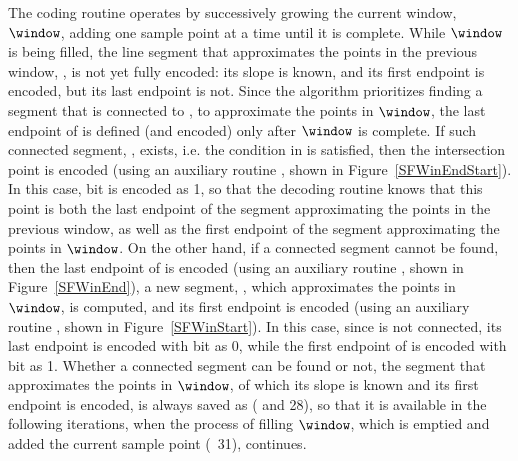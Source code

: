 \vspace{-2pt}



\vspace{-3pt}
The coding routine operates by successively growing the current window, $\window$, adding one sample point at a time until it is complete. While $\window$ is being filled, the line segment that approximates the points in the previous window, \segmentLastT, is not yet fully encoded: its slope is known, and its first endpoint is encoded, but its last endpoint is not. Since the algorithm prioritizes finding a segment that is connected to \segmentLastT, to approximate the points in $\window$, the last endpoint of \segmentLastT is defined (and encoded) only after $\window$ is complete. If such connected segment, \segmentConnT, exists, i.e. the condition in  is satisfied, then the intersection point is encoded (using an auxiliary routine \SFEncodeWinEndStart, shown in Figure~\ref{SFWinEndStart}). In this case, bit \connectedS is encoded as 1, so that the decoding routine knows that this point is both the last endpoint of the segment approximating the points in the previous window, as well as the first endpoint of the segment approximating the points in $\window$. On the other hand, if a connected segment cannot be found, then the last endpoint of \segmentLastT is encoded (using an auxiliary routine \SFWinEndP, shown in Figure~\ref{SFWinEnd}), a new segment, \segmentS, which approximates the points in $\window$, is computed, and its first endpoint is encoded (using an auxiliary routine \SFWinStart, shown in Figure~\ref{SFWinStart}). In this case, since \segmentLastT is not connected, its last endpoint is encoded with bit \connectedS as 0, while the first endpoint of \segmentS is encoded with bit \connectedS as 1. Whether a connected segment can be found or not, the segment that approximates the points in $\window$, of which its slope is known and its first endpoint is encoded, is always saved as \segmentLastT ( and 28), so that it is available in the following iterations, when the process of filling $\window$, which is emptied and added the current sample point (\Line~31), continues.


\vspace{-2pt}


\clearpage




\vspace{-5pt}



